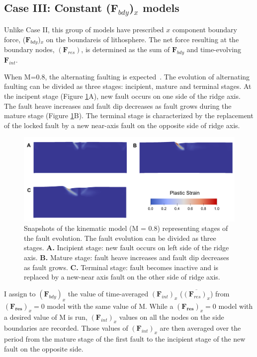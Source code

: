 \documentclass[letterpaper,12pt,notitle]{memphisthesis}                     %
\begin{document}
\subsection{Case III: Constant ($\boldsymbol{F}_{bdy}$)$_x$ models}

Unlike Case II, this group of models have prescribed $x$ component boundary force, ($\boldsymbol{F}_{bdy}$)$_x$ on the boundareis of lithosphere. The net force resulting at the boundary nodes, $(\boldsymbol{F}_{res})$, is determined as the sum of $\boldsymbol{F}_{bdy}$ and time-evolving $\boldsymbol{F}_{int}$.

When M=0.8, the alternating faulting is expected~\citep{Tucholke2008}. The evolution of alternating faulting can be divided as three stages: incipient, mature and terminal stages. At the incipent stage (Figure \ref{fig:faultstage}A), new fault occurs on one side of the ridge axis. The fault heave increases and fault dip decreases as fault grows during the mature stage (Figure \ref{fig:faultstage}B). The terminal stage is characterized by the replacement of the locked fault by a new near-axis fault on the opposite side of ridge axis. 
%
\begin{figure}[!htb]
	\centering
	\includegraphics[width=0.9\linewidth]{./figs/fault_stage.pdf}
	\caption{Snapshots of the kinematic model (M = 0.8) representing stages of the fault evolution. The fault evolution can be divided as three stages. \textbf{A.} Incipient stage: new fault occurs on left side of the ridge axis. \textbf{B.} Mature stage: fault heave increases and fault dip decreases as fault grows. \textbf{C.} Terminal stage: fault becomes inactive and is replaced by a new-near axis fault on the other side of ridge axis.}
	\label{fig:faultstage}
\end{figure}

I assign to $(\boldsymbol{F}_{bdy})_x$ the value of time-averaged $(\boldsymbol{F}_{int})_x$ ($\overline{(\boldsymbol{F}_{res})_x}$) from $(\boldsymbol{F_{res}})_x =0$ model with the same value of M. While a  $(\boldsymbol{F_{res}})_x =0$ model with a desired value of M is run, $(\boldsymbol{F}_{int})_x$ values on all the nodes on the side boundaries are recorded. Those values of $(\boldsymbol{F}_{int})_{x}$ are then averaged over the period from the mature stage of the first fault to the incipient stage of the new fault on the opposite side.
\end{document}
